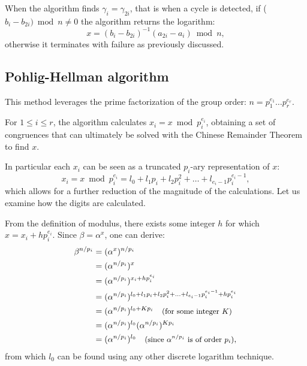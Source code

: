 \documentclass[UTF8]{article}
\begin{document}
When the algorithm finds $\gamma_{i} = \gamma_{2i}$, that is when a cycle is detected, if ($b_{i} - b_{2i}) \bmod{n} \not= 0$ the algorithm returns the logarithm:
$$x = (b_{i} - b_{2i})^{-1} (a_{2i} - a_{i}) \bmod{n},$$
otherwise it terminates with failure as previously discussed.

\begin{minipage}{\linewidth}

\end{minipage}

\subsection{Pohlig-Hellman algorithm}

This method leverages the prime factorization of the group order: $n = p_1^{e_1} \ldots p_r^{e_r}$.

For $1 \leq i \leq r$, the algorithm calculates $x_i = x \bmod{p_i^{e_i}}$, obtaining a set of congruences that can ultimately be solved with the Chinese Remainder Theorem to find $x$.

In particular each $x_i$ can be seen as a truncated $p_i$-ary representation of $x$:
$$x_i = x \bmod{p_i^{e_i}} = l_0 + l_1 p_i + l_2 p_i^2 + \ldots + l_{e_i - 1} p_i^{e_i - 1},$$
which allows for a further reduction of the magnitude of the calculations. Let us examine how the digits are calculated.

From the definition of modulus, there exists some integer $h$ for which $x=x_i+hp_i^{e_i}$. Since \mbox{$\beta=\alpha^x$}, one can derive:
\begin{align*}
    \beta^{n/p_i} & = (\alpha^x)^{n/p_i}                \\
                  & = (\alpha^{n/p_i})^x                \\
                  & = (\alpha^{n/p_i})^{x_i+hp_i^{e_i}} \\
                  & = (\alpha^{n/p_i})^{l_0 + l_1 p_i + l_2 p_i^2 + \ldots + l_{e_i - 1} p_i^{e_i - 1}+hp_i^{e_i}} \\
                  & = (\alpha^{n/p_i})^{l_0 + K p_i} \quad \text{\small{(for some integer $K$)}}  \\
                  & = (\alpha^{n/p_i})^{l_0} (\alpha^{n/p_i})^{K p_i} \\
                  & = (\alpha^{n/p_i})^{l_0} \quad \text{\small{(since $\alpha^{n/p_i}$ is of order $p_i$)}},
\end{align*}
from which $l_0$ can be found using any other discrete logarithm technique.
\end{document}
